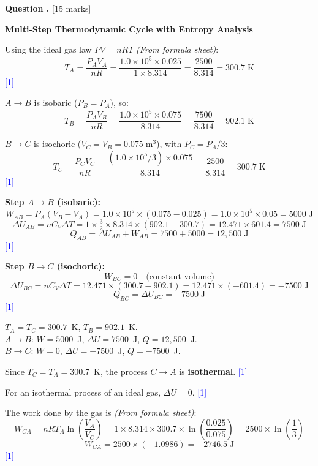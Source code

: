 \documentclass[12pt,a4paper]{article}
\newcounter{questioncounter}
\newcommand{\question}[1]{%
  \stepcounter{questioncounter}%
  \vspace{0.5cm}%
  \noindent\textbf{Question \thequestioncounter.} \hfill [#1 marks]%
  \vspace{0.2cm}%
  \par%
}
\newcommand{\markstep}[1]{\hfill\textcolor{blue}{[#1]}}
\newcommand{\finalanswer}[1]{%
  \begin{tcolorbox}[colback=green!5!white,colframe=green!50!black,boxrule=0.5pt]
  #1
  \end{tcolorbox}
}
\newcommand{\fromsheet}{\textit{(From formula sheet)}}
\begin{document}
\newpage

\question{15}

\noindent\textbf{Multi-Step Thermodynamic Cycle with Entropy Analysis}

\begin{parts}
\item Using the ideal gas law $PV = nRT$ \fromsheet:
\[
T_A = \frac{P_A V_A}{nR} = \frac{1.0\times 10^5 \times 0.025}{1\times 8.314} = \frac{2500}{8.314} = 300.7\;\text{K}
\]
\markstep{1}

$A\to B$ is isobaric ($P_B = P_A$), so:
\[
T_B = \frac{P_A V_B}{nR} = \frac{1.0\times 10^5 \times 0.075}{8.314} = \frac{7500}{8.314} = 902.1\;\text{K}
\]

$B\to C$ is isochoric ($V_C = V_B = 0.075\;\text{m}^3$), with $P_C = P_A/3$:
\[
T_C = \frac{P_C V_C}{nR} = \frac{(1.0\times 10^5/3)\times 0.075}{8.314} = \frac{2500}{8.314} = 300.7\;\text{K}
\]
\markstep{1}

\textbf{Step $A\to B$ (isobaric):}
\[
W_{AB} = P_A(V_B - V_A) = 1.0\times 10^5\times(0.075 - 0.025) = 1.0\times 10^5 \times 0.05 = 5000\;\text{J}
\]
\[
\Delta U_{AB} = nC_V\Delta T = 1\times\tfrac{3}{2}\times 8.314\times(902.1 - 300.7) = 12.471\times 601.4 = 7500\;\text{J}
\]
\[
Q_{AB} = \Delta U_{AB} + W_{AB} = 7500 + 5000 = 12{,}500\;\text{J}
\]
\markstep{1}

\textbf{Step $B\to C$ (isochoric):}
\[
W_{BC} = 0 \quad\text{(constant volume)}
\]
\[
\Delta U_{BC} = nC_V\Delta T = 12.471\times(300.7 - 902.1) = 12.471\times(-601.4) = -7500\;\text{J}
\]
\[
Q_{BC} = \Delta U_{BC} = -7500\;\text{J}
\]
\markstep{1}

\finalanswer{$T_A = T_C = 300.7$~K, $T_B = 902.1$~K.\\[4pt]
$A\to B$: $W = 5000$~J, $\Delta U = 7500$~J, $Q = 12{,}500$~J.\\[4pt]
$B\to C$: $W = 0$, $\Delta U = -7500$~J, $Q = -7500$~J.}

\item Since $T_C = T_A = 300.7$~K, the process $C\to A$ is \textbf{isothermal}. \markstep{1}

For an isothermal process of an ideal gas, $\Delta U = 0$. \markstep{1}

The work done by the gas is \fromsheet:
\[
W_{CA} = nRT_A\ln\!\left(\frac{V_A}{V_C}\right) = 1\times 8.314\times 300.7\times\ln\!\left(\frac{0.025}{0.075}\right) = 2500\times\ln\!\left(\frac{1}{3}\right)
\]
\[
W_{CA} = 2500\times(-1.0986) = -2746.5\;\text{J}
\]
\markstep{1}


\end{parts}
\end{document}
